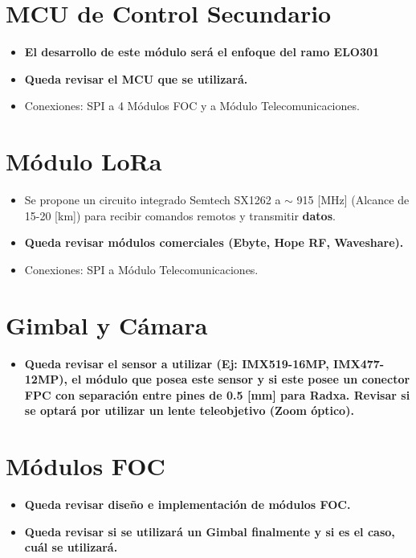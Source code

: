 \documentclass[letterpaper,11pt]{article}
\begin{document}
\section{MCU de Control Secundario} \hypertarget{sec:control}{}
\begin{itemize}
    \item \textbf{El desarrollo de este módulo será el enfoque del ramo ELO301}
    \item \textbf{Queda revisar el MCU que se utilizará.}
    \item Conexiones: SPI a 4 Módulos FOC y a Módulo Telecomunicaciones.
\end{itemize}

\section{Módulo LoRa} \hypertarget{sec:lora}{}
\begin{itemize}
    \item Se propone un circuito integrado Semtech SX1262 a $\sim$ 915 [MHz] (Alcance de 15-20 [km]) para recibir comandos remotos y transmitir \textbf{datos}.
    \item \textbf{Queda revisar módulos comerciales (Ebyte, Hope RF, Waveshare).}
    \item Conexiones: SPI a Módulo Telecomunicaciones.
\end{itemize}

\section{Gimbal y Cámara} \hypertarget{sec:camara}{}
\begin{itemize}
    \item \textbf{Queda revisar el sensor a utilizar (Ej: IMX519-16MP, IMX477-12MP), el módulo que posea este sensor y si este posee un  conector FPC con separación entre pines de 0.5 [mm] para Radxa. Revisar si se optará por utilizar un lente teleobjetivo (Zoom óptico).} 
\end{itemize}

\section{Módulos FOC} \hypertarget{sec:foc}{}
\begin{itemize}
    \item \textbf{Queda revisar diseño e implementación de módulos FOC.}
    \item \textbf{Queda revisar si se utilizará un Gimbal finalmente y si es el caso, cuál se utilizará.}
\end{itemize}
\end{document}
